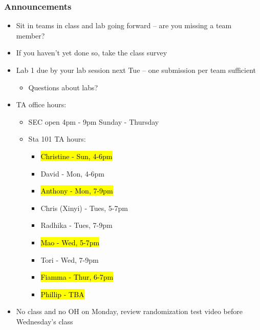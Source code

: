 \documentclass[slidestop,compress,mathserif,12pt,t,professionalfonts,xcolor=table]{beamer}
\begin{document}
\begin{frame}
\frametitle{Announcements}

\begin{itemize}

\item Sit in teams in class and lab going forward -- are you missing a team member?

\item If you haven't yet done so, take the class survey

\item Lab 1 due by your lab session next Tue -- one submission per team sufficient

\begin{itemize}
\item Questions about labs?
\end{itemize}

\item TA office hours:
\begin{itemize}

\item SEC open 4pm - 9pm Sunday - Thursday

\item Sta 101 TA hours:
\vspace{-0.25cm}
\begin{multicols}{2}
\begin{itemize}
\item \hl{Christine - Sun, 4-6pm}
\item David - Mon, 4-6pm
\item \hl{Anthony - Mon, 7-9pm}
\item Chris (Xinyi) - Tues, 5-7pm
\item Radhika - Tues, 7-9pm
\item \hl{Mao - Wed, 5-7pm}
\item Tori - Wed, 7-9pm
\item \hl{Fiamma - Thur, 6-7pm}
\item \hl{Phillip - TBA}
\end{itemize}
\end{multicols}
\vspace{-0.25cm}
\end{itemize}

\item No class and no OH on Monday, review randomization test video before Wednesday's class


\end{itemize}
\end{frame}
\end{document}
